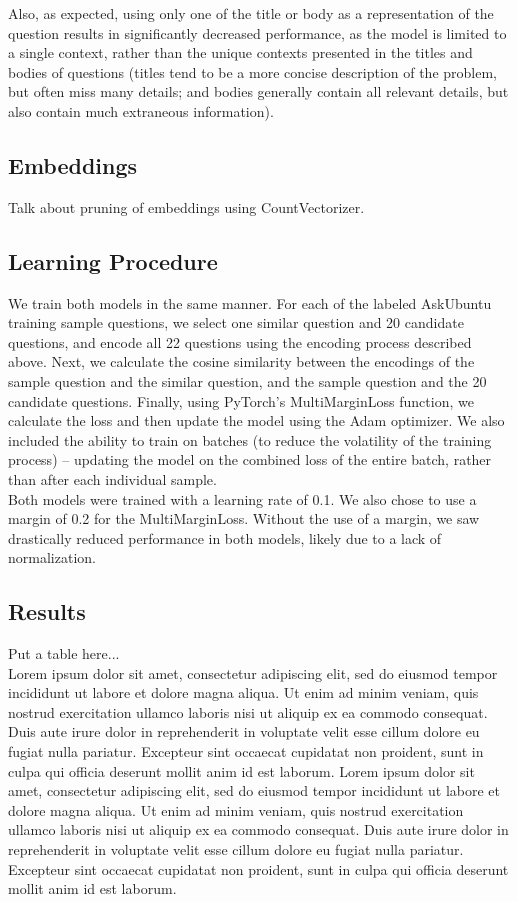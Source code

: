 \documentclass[12pt]{article}
\begin{document}
Also, as expected, using only one of the title or body as a representation of the question results in significantly decreased performance, as the model is limited to a single context, rather than the unique contexts presented in the titles and bodies of questions (titles tend to be a more concise description of the problem, but often miss many details; and bodies generally contain all relevant details, but also contain much extraneous information).

\subsection{Embeddings}
Talk about pruning of embeddings using CountVectorizer.

\subsection{Learning Procedure}
We train both models in the same manner. For each of the labeled AskUbuntu training sample questions, we select one similar question and 20 candidate questions, and encode all 22 questions using the encoding process described above. Next, we calculate the cosine similarity between the encodings of the sample question and the similar question, and the sample question and the 20 candidate questions. Finally, using PyTorch's MultiMarginLoss function, we calculate the loss and then update the model using the Adam optimizer. We also included the ability to train on batches (to reduce the volatility of the training process) -- updating the model on the combined loss of the entire batch, rather than after each individual sample.\\

Both models were trained with a learning rate of 0.1. We also chose to use a margin of 0.2 for the MultiMarginLoss. Without the use of a margin, we saw drastically reduced performance in both models, likely due to a lack of normalization.

\subsection{Results}
Put a table here...\\

Lorem ipsum dolor sit amet, consectetur adipiscing elit, sed do eiusmod tempor incididunt ut labore et dolore magna aliqua. Ut enim ad minim veniam, quis nostrud exercitation ullamco laboris nisi ut aliquip ex ea commodo consequat. Duis aute irure dolor in reprehenderit in voluptate velit esse cillum dolore eu fugiat nulla pariatur. Excepteur sint occaecat cupidatat non proident, sunt in culpa qui officia deserunt mollit anim id est laborum. Lorem ipsum dolor sit amet, consectetur adipiscing elit, sed do eiusmod tempor incididunt ut labore et dolore magna aliqua. Ut enim ad minim veniam, quis nostrud exercitation ullamco laboris nisi ut aliquip ex ea commodo consequat. Duis aute irure dolor in reprehenderit in voluptate velit esse cillum dolore eu fugiat nulla pariatur. Excepteur sint occaecat cupidatat non proident, sunt in culpa qui officia deserunt mollit anim id est laborum.
\end{document}
